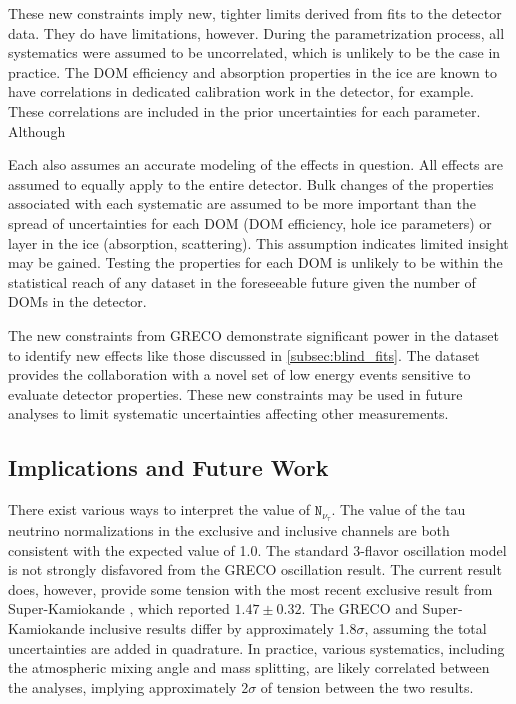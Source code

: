 These new constraints imply new, tighter limits derived from fits to the detector data.
They do have limitations, however.
During the parametrization process, all systematics were assumed to be uncorrelated, which is unlikely to be the case in practice.
The DOM efficiency and absorption properties in the ice are known to have correlations in dedicated calibration work in the detector, for example.
These correlations are included in the prior uncertainties for each parameter.
Although

Each also assumes an accurate modeling of the effects in question.
All effects are assumed to equally apply to the entire detector.
Bulk changes of the properties associated with each systematic are assumed to be more important than the spread of uncertainties for each DOM (DOM efficiency, hole ice parameters) or layer in the ice (absorption, scattering).
This assumption indicates limited insight may be gained.
Testing the properties for each DOM is unlikely to be within the statistical reach of any dataset in the foreseeable future given the number of DOMs in the detector.

The new constraints from GRECO demonstrate significant power in the dataset to identify new effects like those discussed in \ref{subsec:blind_fits}.
The dataset provides the collaboration with a novel set of low energy events sensitive to evaluate detector properties.
These new constraints may be used in future analyses to limit systematic uncertainties affecting other measurements.

\label{subsec:implications}
\subsection{Implications and Future Work}
There exist various ways to interpret the value of $\mathtt{N_{\nu_\tau}}$. 
The value of the tau neutrino normalizations in the exclusive and inclusive channels  are both consistent with the expected value of 1.0.
The standard 3-flavor oscillation model is not strongly disfavored from the GRECO oscillation result.
The current result does, however, provide some tension with the most recent exclusive result from Super-Kamiokande , which reported $\mathtt{1.47\pm0.32}$. 
The GRECO and Super-Kamiokande inclusive results differ by approximately 1.8$\mathtt{\sigma}$, assuming the total uncertainties are added in quadrature.
In practice, various systematics, including the atmospheric mixing angle and mass splitting, are likely correlated between the analyses, implying approximately 2$\mathtt{\sigma}$ of tension between the two results.

